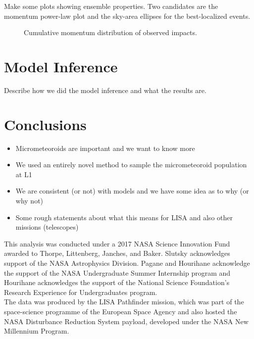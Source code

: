 \documentclass[preprint, trackchanges]{aastex61}
\begin{document}
Make some plots showing ensemble properties. Two candidates are the momentum power-law plot and the sky-area ellipses for the best-localized events.
\begin{figure}[ht!]
\caption{Cumulative momentum distribution of observed impacts. \label{fig:CDF_P}}
\end{figure}


\FloatBarrier
\section{Model Inference} \label{sec:models}

Describe how we did the model inference and what the results are.

\section{Conclusions} \label{sec:conclusions}

\begin{itemize}
\item Micrometeoroids are important and we want to know more
\item We used an entirely novel method to sample the micrometeoroid population at L1
\item We are consistent (or not) with models and we have some idea as to why (or why not)
\item Some rough statements about what this means for LISA  and also other missions (telescopes)
\end{itemize}
\acknowledgments

This analysis was conducted under a 2017 NASA Science Innovation Fund awarded to Thorpe, Littenberg, Janches, and Baker. Slutsky acknowledges support of the NASA Astrophysics Division. Pagane and Hourihane acknowledge the support of the NASA Undergraduate Summer Internship program and Hourihane acknowledges the support of the National Science Foundation's Research Experience for Undergraduates program.
\\

The data was produced by the LISA Pathfinder mission, which was part of the
space-science programme of the European Space Agency and also hosted the NASA Disturbance Reduction System payload, developed under the NASA New Millennium Program. 
\end{document}
